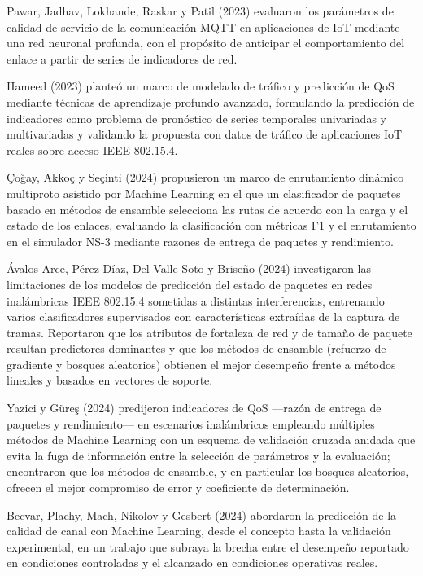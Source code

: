 \documentclass[
  12pt,
]{article}
\begin{document}
Pawar, Jadhav, Lokhande, Raskar y Patil (2023) evaluaron los parámetros
de calidad de servicio de la comunicación MQTT en aplicaciones de IoT
mediante una red neuronal profunda, con el propósito de anticipar el
comportamiento del enlace a partir de series de indicadores de red.

Hameed (2023) planteó un marco de modelado de tráfico y predicción de
QoS mediante técnicas de aprendizaje profundo avanzado, formulando la
predicción de indicadores como problema de pronóstico de series
temporales univariadas y multivariadas y validando la propuesta con
datos de tráfico de aplicaciones IoT reales sobre acceso IEEE 802.15.4.

Çoğay, Akkoç y Seçinti (2024) propusieron un marco de enrutamiento
dinámico multiproto asistido por Machine Learning en el que un
clasificador de paquetes basado en métodos de ensamble selecciona las
rutas de acuerdo con la carga y el estado de los enlaces, evaluando la
clasificación con métricas F1 y el enrutamiento en el simulador NS-3
mediante razones de entrega de paquetes y rendimiento.

Ávalos-Arce, Pérez-Díaz, Del-Valle-Soto y Briseño (2024) investigaron
las limitaciones de los modelos de predicción del estado de paquetes en
redes inalámbricas IEEE 802.15.4 sometidas a distintas interferencias,
entrenando varios clasificadores supervisados con características
extraídas de la captura de tramas. Reportaron que los atributos de
fortaleza de red y de tamaño de paquete resultan predictores dominantes
y que los métodos de ensamble (refuerzo de gradiente y bosques
aleatorios) obtienen el mejor desempeño frente a métodos lineales y
basados en vectores de soporte.

Yazici y Güreş (2024) predijeron indicadores de QoS —razón de entrega de
paquetes y rendimiento— en escenarios inalámbricos empleando múltiples
métodos de Machine Learning con un esquema de validación cruzada anidada
que evita la fuga de información entre la selección de parámetros y la
evaluación; encontraron que los métodos de ensamble, y en particular los
bosques aleatorios, ofrecen el mejor compromiso de error y coeficiente
de determinación.

Becvar, Plachy, Mach, Nikolov y Gesbert (2024) abordaron la predicción
de la calidad de canal con Machine Learning, desde el concepto hasta la
validación experimental, en un trabajo que subraya la brecha entre el
desempeño reportado en condiciones controladas y el alcanzado en
condiciones operativas reales.
\end{document}
